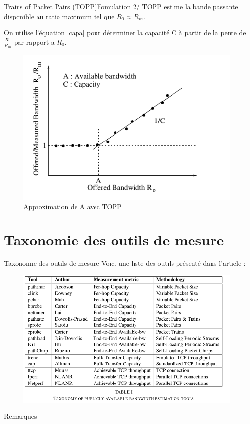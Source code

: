 \documentclass[compress]{beamer}
\begin{document}
\begin{frame}{Trains of Packet Pairs (TOPP)}{Fomulation 2/}
TOPP estime la bande passante disponible au ratio maximum tel que 
$R_0 \approx R_m$.

On utilise l'équation \eqref{capa} pour déterminer la capacité C à partir 
de la pente de $\frac{R_0}{R_m}$ par rapport a $R_0$.
\begin{figure}[hbtp]
		\centering
		\includegraphics[scale=0.4]{TOPP.png}
		\caption{Approximation de A avec TOPP}
	\end{figure}
\end{frame}

\section{Taxonomie des outils de mesure}
\begin{frame}{Taxonomie des outils de mesure}
Voici une liste des outils présenté dans l'article :


\begin{figure}[hbtp]
		\centering
		\includegraphics[scale=0.4]{tools.png}
	\end{figure}
\end{frame}
\begin{frame}{Remarques}

\end{frame}
\end{document}
